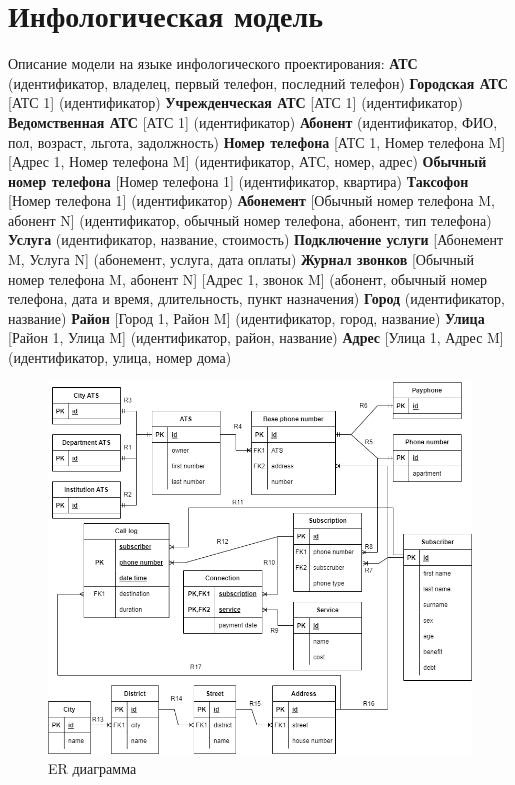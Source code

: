 \documentclass{report}
\begin{document}
\section{Инфологическая модель}
Описание модели на языке инфологического проектирования:
\newline\textbf{АТС} (идентификатор, владелец, первый телефон, последний телефон)
\newline\textbf{Городская АТС} [АТС 1] (идентификатор)
\newline\textbf{Учрежденческая АТС} [АТС 1] (идентификатор)
\newline\textbf{Ведомственная АТС} [АТС 1] (идентификатор)
\newline\textbf{Абонент} (идентификатор, ФИО, пол, возраст, льгота, задолжность)
\newline\textbf{Номер телефона} [АТС 1, Номер телефона M] [Адрес 1, Номер телефона M] (идентификатор, АТС, номер, адрес)
\newline\textbf{Обычный номер телефона} [Номер телефона 1] (идентификатор, квартира)
\newline\textbf{Таксофон} [Номер телефона 1] (идентификатор)
\newline\textbf{Абонемент} [Обычный номер телефона M, абонент N] (идентификатор, 
обычный номер телефона, абонент, тип телефона)
\newline\textbf{Услуга} (идентификатор, название, стоимость)
\newline\textbf{Подключение услуги} [Абонемент M, Услуга N] (абонемент, услуга, дата оплаты)
\newline\textbf{Журнал звонков} [Обычный номер телефона M, абонент N] [Адрес 1, звонок M] 
(абонент, обычный номер телефона, дата и время, длительность, пункт назначения)
\newline\textbf{Город} (идентификатор, название)
\newline\textbf{Район} [Город 1, Район M] (идентификатор, город, название)
\newline\textbf{Улица} [Район 1, Улица M] (идентификатор, район, название)
\newline\textbf{Адрес} [Улица 1, Адрес M] (идентификатор, улица, номер дома)

\begin{figure}[!ht]
    \begin{center}
    \includegraphics[width=\textwidth]{resources/er.png}
    \caption{ER диаграмма}
    \end{center}
\end{figure}
\end{document}
